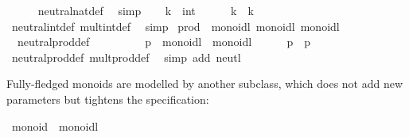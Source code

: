 \begin{isabellebody}
\ \ \ \ \isamarkupfalse%
\ neutral{\isacharunderscore}nat{\isacharunderscore}def\ \isamarkupfalse%
\ simp\isanewline
{}\isamarkupfalse%
\isanewline
\ \ \isamarkupfalse%
\ k\ {\isacharcolon}{\isacharcolon}\ int\isanewline
\ \ \isamarkupfalse%
\ {\isachardoublequoteopen}{\isasymone}\ {\isasymotimes}\ k\ {\isacharequal}\ k{\isachardoublequoteclose}\isanewline
\ \ \ \ \isamarkupfalse%
\ neutral{\isacharunderscore}int{\isacharunderscore}def\ mult{\isacharunderscore}int{\isacharunderscore}def\ \isamarkupfalse%
\ simp\isanewline
{}\isamarkupfalse%
\isanewline
\isanewline
{}\isamarkupfalse%
\isanewline
\isanewline
{}\isamarkupfalse%
\ prod\ {\isacharcolon}{\isacharcolon}\ {\isacharparenleft}monoidl{\isacharcomma}\ monoidl{\isacharparenright}\ monoidl\isanewline
{}\isanewline
\isanewline
{}\isamarkupfalse%
\isanewline
\ \ neutral{\isacharunderscore}prod{\isacharunderscore}def{\isacharcolon}\ {\isachardoublequoteopen}{\isasymone}\ {\isacharequal}\ {\isacharparenleft}{\isasymone}{\isacharcomma}\ {\isasymone}{\isacharparenright}{\isachardoublequoteclose}\isanewline
\isanewline
{}\isamarkupfalse%
\ \isamarkupfalse%
\isanewline
\ \ \isamarkupfalse%
\ p\ {\isacharcolon}{\isacharcolon}\ {\isachardoublequoteopen}{\isasymalpha}{\isasymColon}monoidl\ {\isasymtimes}\ {\isasymbeta}{\isasymColon}monoidl{\isachardoublequoteclose}\isanewline
\ \ \isamarkupfalse%
\ {\isachardoublequoteopen}{\isasymone}\ {\isasymotimes}\ p\ {\isacharequal}\ p{\isachardoublequoteclose}\isanewline
\ \ \ \ \isamarkupfalse%
\ neutral{\isacharunderscore}prod{\isacharunderscore}def\ mult{\isacharunderscore}prod{\isacharunderscore}def\ \isamarkupfalse%
\ {\isacharparenleft}simp\ add{\isacharcolon}\ neutl{\isacharparenright}\isanewline
{}\isamarkupfalse%
\isanewline
\isanewline
{}\isamarkupfalse%
%
\endisatagquote
{\isafoldquote}%
%
\isadelimquote
%
\endisadelimquote
%
\begin{isamarkuptext}%
\noindent Fully-fledged monoids are modelled by another subclass,
  which does not add new parameters but tightens the specification:%
\end{isamarkuptext}%
\isamarkuptrue%
%
\isadelimquote
%
\endisadelimquote
%
\isatagquote
{}\isamarkupfalse%
\ monoid\ {\isacharequal}\ monoidl\ {\isacharplus}\isanewline

\end{isabellebody}
